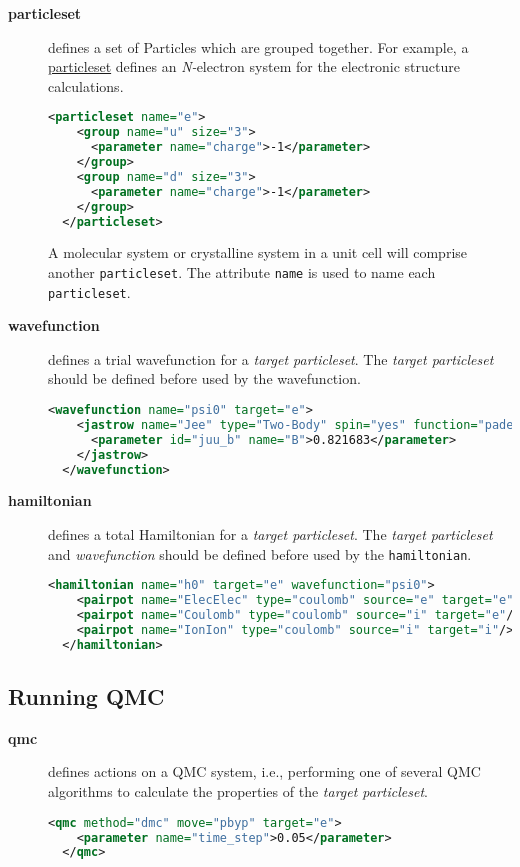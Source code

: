 \begin{description}
\item[\textbf{particleset}{}]
defines a set of Particles which are grouped together.  For example, a
\hyperlink{particleset.element}{particleset} defines an \emph{N-{}}electron
system for the electronic structure calculations.
 
\begin{lstlisting}[language=XML,emph={particleset},emphstyle=\bfseries\color{blue}]
  <particleset name="e">
    <group name="u" size="3">
      <parameter name="charge">-1</parameter>
    </group>
    <group name="d" size="3">
      <parameter name="charge">-1</parameter>
    </group>
  </particleset> 
\end{lstlisting}
A molecular system or crystalline system in a unit cell will comprise another
\texttt{particleset}.  The attribute \texttt{name} is used to name each
\texttt{particleset}.
 
\item[\textbf{wavefunction}{}]\label{wavefuncion.intro}
defines a trial wavefunction for a \emph{target particleset}.  The \emph{target
particleset} should be defined before used by the wavefunction.
 
\begin{lstlisting}[language=XML,emph={wavefunction},emphstyle=\bfseries\color{blue}]
  <wavefunction name="psi0" target="e">
    <jastrow name="Jee" type="Two-Body" spin="yes" function="pade">
      <parameter id="juu_b" name="B">0.821683</parameter>
    </jastrow>
  </wavefunction> 
\end{lstlisting}

\item[\textbf{hamiltonian}{}]
defines a total Hamiltonian for a \emph{target particleset}. The \emph{target
particleset}  and \emph{wavefunction} should be defined before used by the
\texttt{hamiltonian}.
 
\begin{lstlisting}[language=XML,emph={hamiltonian},emphstyle=\bfseries\color{blue}]
  <hamiltonian name="h0" target="e" wavefunction="psi0">
    <pairpot name="ElecElec" type="coulomb" source="e" target="e"/>
    <pairpot name="Coulomb" type="coulomb" source="i" target="e"/>
    <pairpot name="IonIon" type="coulomb" source="i" target="i"/>
  </hamiltonian> 
\end{lstlisting}
\end{description}

\subsection{Running  QMC}

\begin{description}
\item[\textbf{qmc}{}]
defines actions on a QMC system, i.e., performing one of several QMC algorithms
to calculate the properties of the \emph{target particleset}.
 
\begin{lstlisting}[language=XML,emph={qmc},emphstyle=\bfseries\color{blue}]
  <qmc method="dmc" move="pbyp" target="e">
    <parameter name="time_step">0.05</parameter>
  </qmc> \end{lstlisting}
\end{description}
